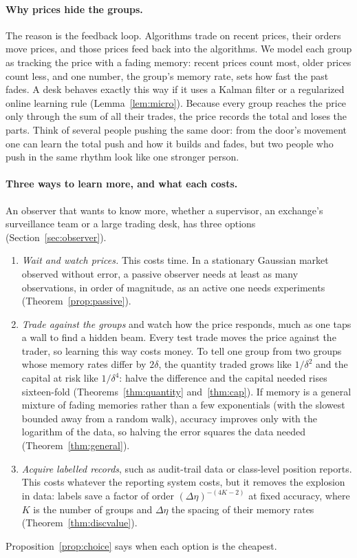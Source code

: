 \documentclass[12pt]{article}
\theoremstyle{definition}
\theoremstyle{remark}
\begin{document}
\paragraph{Why prices hide the groups.} The reason is the feedback loop. Algorithms trade on recent prices, their orders move prices, and those prices feed back into the algorithms. We model each group as tracking the price with a fading memory: recent prices count most, older prices count less, and one number, the group's memory rate, sets how fast the past fades. A desk behaves exactly this way if it uses a Kalman filter or a regularized online learning rule (Lemma~\ref{lem:micro}). Because every group reaches the price only through the sum of all their trades, the price records the total and loses the parts. Think of several people pushing the same door: from the door's movement one can learn the total push and how it builds and fades, but two people who push in the same rhythm look like one stronger person.

\paragraph{Three ways to learn more, and what each costs.} An observer that wants to know more, whether a supervisor, an exchange's surveillance team or a large trading desk, has three options (Section~\ref{sec:observer}).
\begin{enumerate}[label=(\alph*),itemsep=1pt]
\item \emph{Wait and watch prices.} This costs time. In a stationary Gaussian market observed without error, a passive observer needs at least as many observations, in order of magnitude, as an active one needs experiments (Theorem~\ref{prop:passive}).
\item \emph{Trade against the groups} and watch how the price responds, much as one taps a wall to find a hidden beam. Every test trade moves the price against the trader, so learning this way costs money. To tell one group from two groups whose memory rates differ by $2\delta$, the quantity traded grows like $1/\delta^{2}$ and the capital at risk like $1/\delta^{4}$: halve the difference and the capital needed rises sixteen-fold (Theorems~\ref{thm:quantity} and~\ref{thm:cap}). If memory is a general mixture of fading memories rather than a few exponentials (with the slowest bounded away from a random walk), accuracy improves only with the logarithm of the data, so halving the error squares the data needed (Theorem~\ref{thm:general}).
\item \emph{Acquire labelled records}, such as audit-trail data or class-level position reports. This costs whatever the reporting system costs, but it removes the explosion in data: labels save a factor of order $(\Delta\eta)^{-(4K-2)}$ at fixed accuracy, where $K$ is the number of groups and $\Delta\eta$ the spacing of their memory rates (Theorem~\ref{thm:discvalue}).
\end{enumerate}
Proposition~\ref{prop:choice} says when each option is the cheapest.
\end{document}
